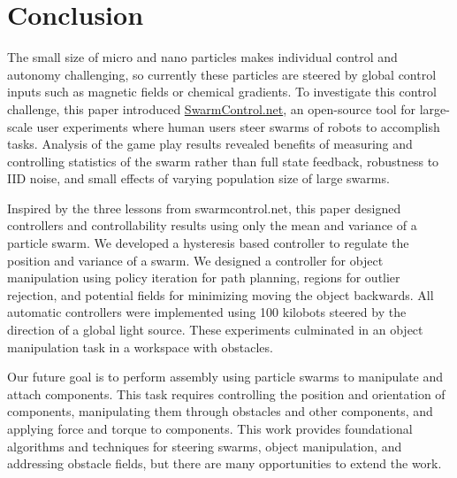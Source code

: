\section{Conclusion}\label{sec:conclusion}
 
  The small size of micro and nano particles makes individual control and autonomy challenging, so currently these particles are steered by global control inputs such as magnetic fields or chemical gradients. To investigate this control challenge, this paper introduced \href{http://www.swarmcontrol.net}{SwarmControl.net}, an open-source tool for large-scale user experiments where human users steer swarms of robots to accomplish tasks.  Analysis of the game play results revealed benefits of measuring and controlling statistics of the swarm rather than full state feedback, robustness to IID noise, and small effects of varying population size of large swarms.

Inspired by the three lessons from swarmcontrol.net, this paper designed controllers and controllability results using only the mean and variance of a particle swarm. 
We developed a hysteresis based controller to regulate the position and variance of a swarm. We designed a controller for object manipulation using policy iteration for path planning, regions for outlier rejection, and potential fields for minimizing moving the object backwards. 
All automatic controllers were implemented using 100 kilobots steered by the direction of a global light source.
These experiments culminated in an object manipulation task in a workspace with obstacles.
    


Our future goal is to perform assembly using particle swarms to manipulate and attach components. This task requires controlling the position and orientation of components, manipulating them through obstacles and other components, and applying force and torque to components. This work provides foundational algorithms and techniques for steering swarms, object manipulation, and addressing obstacle fields, but there are many opportunities to extend the work.

